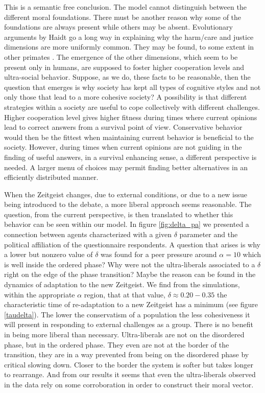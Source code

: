 \documentclass[twocolumn,showpacs]{revtex4-1}
\begin{document}
This is a semantic free conclusion. The model cannot distinguish
between the different moral foundations. There must be another 
reason why some of the foundations are always present while others 
may be absent. Evolutionary arguments by Haidt 
go a long way in explaining why the harm/care and justice dimensions 
are more uniformly common. They may be found, to some extent in other
primates \cite{DeWaal,Katz}. The emergence of the other dimensions, which seem 
to be present only in humans, are supposed to foster higher
cooperation levels and ultra-social behavior. Suppose, as we do, 
these facts to be
reasonable, then the question that emerges is why society has kept
all types of cognitive styles and not only those that lead to a more
cohesive society? A possibility is that different strategies within 
a society are useful to  cope collectively 
with different challenges. Higher
cooperation level gives higher fitness during times where current opinions
lead to correct answers from a survival point of view. Conservative
behavior would then be the fittest when maintaining current behavior is beneficial to 
the society. However, during times when current opinions are not guiding
in the finding of useful answers, in a  survival enhancing sense,
a different perspective is needed. A larger menu of choices
may permit finding better alternatives in an efficiently distributed
manner. 

When the Zeitgeist changes, due to external conditions, or
due to a new issue being introduced to the debate, a more liberal 
approach seems reasonable. The question, from the current perspective,
is then translated to whether this behavior can be seen within our model.
In figure \ref{fig:delta_pa} we presented a connection between agents 
characterized with a given $\delta$ parameter and the political 
affiliation of the questionnaire respondents. A question that
arises is why a lower but nonzero 
value of $\delta$ was found
for a peer pressure around $\alpha =10$ which is
well inside the ordered phase? Why were not the ultra-liberals associated
to a $\delta$ right on the edge of the phase transition? Maybe the reason 
can be found in the dynamics of adaptation to the new Zeitgeist. We find
from the simulations, within the appropriate $\alpha $ region,
 that at that value, $\delta \approx 0.20 - 0.35$  the characteristic time of
re-adaptation to a new Zeitgeist has a minimum
(see figure \ref{taudelta}). The lower the conservatism of a population 
the less cohesiveness it will present 
in responding to external challenges as a group. There is no benefit
in being more liberal than necessary. Ultra-liberals are not
on the disordered phase, but in the ordered phase. They even 
 are not at the border of the transition, they are in a way prevented
from being on the  disordered phase by critical 
slowing down. Closer to the border the
system is softer but takes longer to rearrange. And from our results it
seems that even the ultra-liberals observed in the data rely on some corroboration in order
to construct their moral vector.
\end{document}
